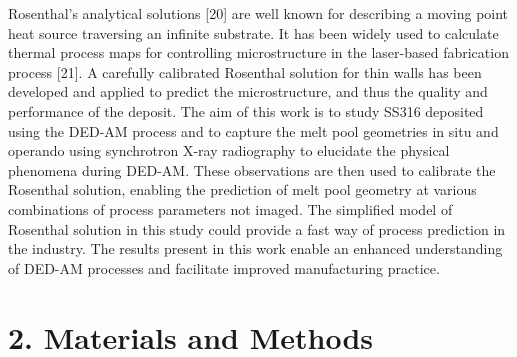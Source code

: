 \documentclass[10pt]{article}
\begin{document}
Rosenthal's analytical solutions [20] are well known for describing a moving point heat source traversing an infinite substrate. It has been widely used to calculate thermal process maps for controlling microstructure in the laser-based fabrication process [21]. A carefully calibrated Rosenthal solution for thin walls has been developed and applied to predict the microstructure, and thus the quality and performance of the deposit. The aim of this work is to study SS316 deposited using the DED-AM process and to capture the melt pool geometries in situ and operando using synchrotron X-ray radiography to elucidate the physical phenomena during DED-AM. These observations are then used to calibrate the Rosenthal solution, enabling the prediction of melt pool geometry at various combinations of process parameters not imaged. The simplified model of Rosenthal solution in this study could provide a fast way of process prediction in the industry. The results present in this work enable an enhanced understanding of DED-AM processes and facilitate improved manufacturing practice.

\section*{2. Materials and Methods}
\end{document}
